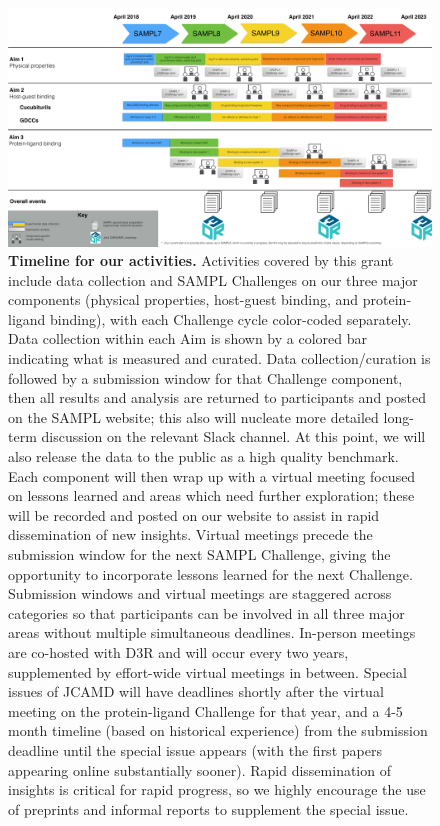 \documentclass[11pt]{article}
\begin{document}
\begin{figure}[h]
\vspace{-0.10in}
\begin{centering}
\includegraphics[width=\textwidth]{figures/Timeline3_cropped.pdf}
\end{centering}
\vspace{-0.25in}
\caption{\footnotesize {\bf Timeline for our activities.} Activities covered by this grant include data collection and SAMPL Challenges on our three major components (physical properties, host-guest binding, and protein-ligand binding), with each Challenge cycle color-coded separately.  
Data collection within each Aim is shown by a colored bar indicating what is measured and curated.
Data collection/curation is followed by a submission window for that Challenge component, then all results and analysis are returned to participants and posted on the SAMPL website; this also will nucleate more detailed long-term discussion on the relevant Slack channel.
At this point, we will also release the data to the public as a high quality benchmark.
Each component will then wrap up with a virtual meeting focused on lessons learned and areas which need further exploration; these will be recorded and posted on our website to assist in rapid dissemination of new insights. 
Virtual meetings precede the submission window for the next SAMPL Challenge, giving the opportunity to incorporate lessons learned for the next Challenge.
Submission windows and virtual meetings are staggered across categories so that participants can be involved in all three major areas without multiple simultaneous deadlines.
In-person meetings are co-hosted with D3R and will occur every two years, supplemented by effort-wide virtual meetings in between.
Special issues of JCAMD will have deadlines shortly after the virtual meeting on the protein-ligand Challenge for that year, and a 4-5 month timeline (based on historical experience) from the submission deadline until the special issue appears (with the first papers appearing online substantially sooner).
Rapid dissemination of insights is critical for rapid progress, so we highly encourage the use of preprints and informal reports to supplement the special issue.
\vspace{-0.1in}
\label{figure:timeline}}
\end{figure}
\end{document}
